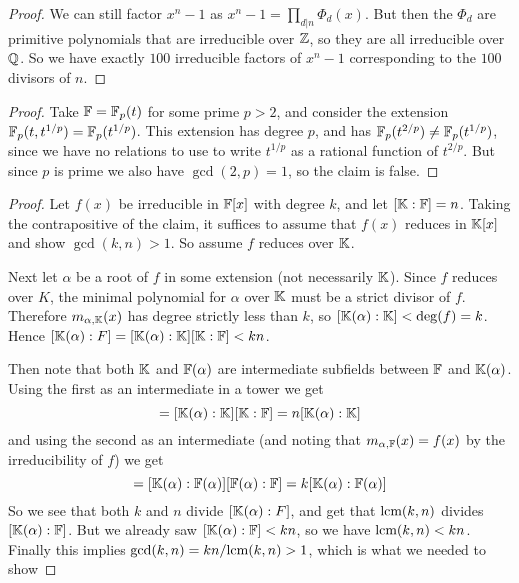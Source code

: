 \documentclass[11pt]{article}
\begin{document}
\begin{proof}
  We can still factor $x^n - 1$ as $x^n - 1 = \prod_{d | n} \Phi_d(x)$.
  But then the $\Phi_d$ are primitive polynomials that are irreducible over $\mathbb{Z}$, so they are all irreducible over $\mathbb{Q}$.
  So we have exactly $100$ irreducible factors of $x^n-1$ corresponding to the $100$ divisors of $n$.
\end{proof}

\begin{proof}
  Take $\mathbb{F} = \mathbb{F}_p(t)$ for some prime $p > 2$, and consider the extension $\mathbb{F}_p(t, t^{1/p}) = \mathbb{F}_p(t^{1/p})$.
  This extension has degree $p$, and has $\mathbb{F}_p(t^{2/p}) \ne \mathbb{F}_p(t^{1/p})$, since we have no relations to use to write $t^{1/p}$ as a rational function of $t^{2/p}$.
  But since $p$ is prime we also have $\gcd(2,p) = 1$, so the claim is false.
\end{proof}


\begin{proof}
  Let $f(x)$ be irreducible in $\mathbb{F}[x]$ with degree $k$, and let $[\mathbb{K}:\mathbb{F}] = n$.
  Taking the contrapositive of the claim, it suffices to assume that $f(x)$ reduces in $\mathbb{K}[x]$ and show $\gcd(k,n) > 1$.
  So assume $f$ reduces over $\mathbb{K}$.

  Next let $\alpha$ be a root of $f$ in some extension (not necessarily $\mathbb{K}$).
  Since $f$ reduces over $K$, the minimal polynomial for $\alpha$ over $\mathbb{K}$ must be a strict divisor of $f$.
  Therefore $m_{\alpha, \mathbb{K}}(x)$ has degree strictly less than $k$, so $[\mathbb{K}(\alpha) : \mathbb{K}] < \deg(f) = k$.
  Hence $[\mathbb{K}(\alpha) : F] = [\mathbb{K}(\alpha) : \mathbb{K}][\mathbb{K} : \mathbb{F}] < kn$.

  Then note that both $\mathbb{K}$ and $\mathbb{F}(\alpha)$ are intermediate subfields between $\mathbb{F}$ and $\mathbb{K}(\alpha)$. Using the first as an intermediate in a tower we get
  \begin{equation*}
    [\K(\alpha) : \F] = [\K(\alpha) : \K][\K : \F] = n[\K(\alpha) : \K]
  \end{equation*}
  and using the second as an intermediate (and noting that $m_{\alpha, \mathbb{F}}(x) = f(x)$ by the irreducibility of $f$) we get
  \begin{equation*}
    [\K(\alpha) : \F] = [\K(\alpha) : \F(\alpha)][\F(\alpha) : \F] = k[\K(\alpha) : \F(\alpha)]
  \end{equation*}
  So we see that both $k$ and $n$ divide $[\mathbb{K}(\alpha) : F]$, and get that $\text{lcm}(k,n)$ divides $[\mathbb{K}(\alpha) : \mathbb{F}]$.
  But we already saw $[\mathbb{K}(\alpha) : \mathbb{F}] < kn$, so we have $\text{lcm}(k,n) < kn$.
  Finally this implies $\gcd(k,n) = kn/\text{lcm}(k,n) > 1$, which is what we needed to show
\end{proof}
\end{document}
